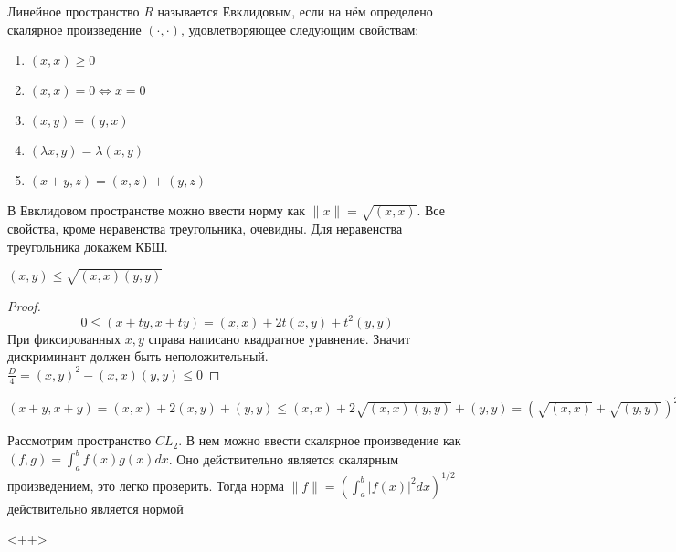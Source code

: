 \documentclass[document.tex]{subfiles}
\begin{document}
\begin{definition}
    Линейное пространство $R$ называется Евклидовым, если на нём определено скалярное произведение $(\cdot, \cdot)$,
    удовлетворяющее следующим свойствам:
    \begin{enumerate}
        \item $(x, x) \geq 0$
        \item $(x, x) = 0 \Leftrightarrow x = 0$
        \item $(x, y) = (y, x)$
        \item $(\lambda x, y) = \lambda (x, y)$
        \item $(x + y, z) = (x, z) + (y, z)$
    \end{enumerate}
\end{definition}

\begin{remark}
    В Евклидовом пространстве можно ввести норму как $\|x\| = \sqrt{(x, x)}$. Все свойства, кроме неравенства
    треугольника, очевидны. Для неравенства треугольника докажем КБШ.
\end{remark}

\begin{theorem}
    $(x, y) \leq \sqrt{(x, x) (y, y)}$
\end{theorem}

\begin{proof}
    \[
        0 \leq (x + ty, x + ty) = (x, x) + 2t(x, y) + t^2(y, y)
    \]
    При фиксированных $x, y$ справа написано квадратное уравнение. Значит дискриминант должен быть неположительный.
    $\frac{D}{4} = (x, y)^2 - (x, x)(y, y) \leq 0$
\end{proof}

\begin{corollary}
    $(x + y, x + y) = (x, x) + 2(x, y) + (y, y) \leq (x, x) + 2\sqrt{(x, x)(y, y)} + (y, y) = (\sqrt{(x, x)} +
    \sqrt{(y, y)})^2$
\end{corollary}

\begin{example}
    Рассмотрим пространство $CL_{2}$. В нем можно ввести скалярное произведение как $(f, g) = \int_{a}^{b}f(x)g(x)dx$.
    Оно действительно является скалярным произведением, это легко проверить. Тогда норма $\|f\| = \left(
    \int_{a}^{b}|f(x)|^2dx \right)^{1/2}$ действительно является нормой
\end{example}<++>
\end{document}
